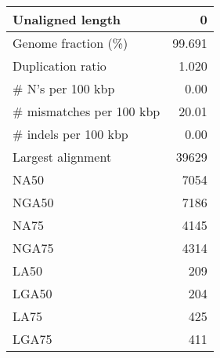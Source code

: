 \documentclass[12pt,a4paper]{article}
\begin{document}
\begin{table}[ht]
\begin{center}
\begin{tabular}{|l*{1}{|r}|}
Unaligned length & 0 \\ \hline
Genome fraction (\%) & 99.691 \\ \hline
Duplication ratio & 1.020 \\ \hline
\# N's per 100 kbp & 0.00 \\ \hline
\# mismatches per 100 kbp & 20.01 \\ \hline
\# indels per 100 kbp & 0.00 \\ \hline
Largest alignment & 39629 \\ \hline
NA50 & 7054 \\ \hline
NGA50 & 7186 \\ \hline
NA75 & 4145 \\ \hline
NGA75 & 4314 \\ \hline
LA50 & 209 \\ \hline
LGA50 & 204 \\ \hline
LA75 & 425 \\ \hline
LGA75 & 411 \\ \hline
\end{tabular}
\end{center}
\end{table}
\end{document}
